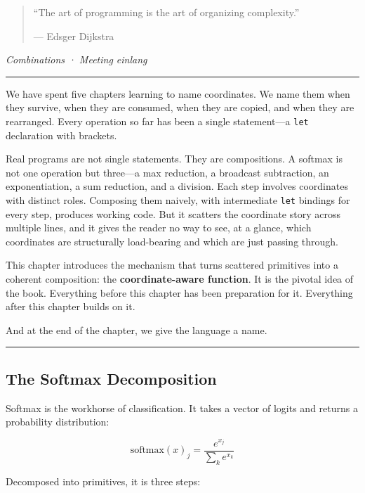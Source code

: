 \documentclass[11pt,]{article}
\begin{document}
\begin{quote}
``The art of programming is the art of organizing complexity.''

--- Edsger Dijkstra
\end{quote}

\emph{Combinations · Meeting einlang}

\begin{center}\rule{0.5\linewidth}{0.4pt}\end{center}

We have spent five chapters learning to name coordinates. We name them
when they survive, when they are consumed, when they are copied, and
when they are rearranged. Every operation so far has been a single
statement---a \texttt{let} declaration with brackets.

Real programs are not single statements. They are compositions. A
softmax is not one operation but three---a max reduction, a broadcast
subtraction, an exponentiation, a sum reduction, and a division. Each
step involves coordinates with distinct roles. Composing them naively,
with intermediate \texttt{let} bindings for every step, produces working
code. But it scatters the coordinate story across multiple lines, and it
gives the reader no way to see, at a glance, which coordinates are
structurally load-bearing and which are just passing through.

This chapter introduces the mechanism that turns scattered primitives
into a coherent composition: the \textbf{coordinate-aware function}. It
is the pivotal idea of the book. Everything before this chapter has been
preparation for it. Everything after this chapter builds on it.

And at the end of the chapter, we give the language a name.

\begin{center}\rule{0.5\linewidth}{0.4pt}\end{center}

\hypertarget{the-softmax-decomposition}{%
\subsection{The Softmax Decomposition}\label{the-softmax-decomposition}}

Softmax is the workhorse of classification. It takes a vector of logits
and returns a probability distribution:

\[\text{softmax}(x)_j = \frac{e^{x_j}}{\sum_k e^{x_k}}\]

Decomposed into primitives, it is three steps:
\end{document}
